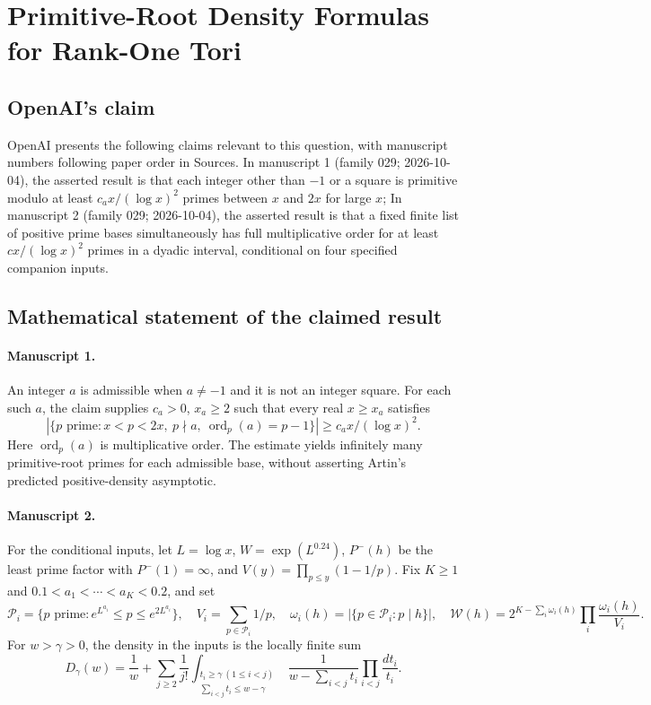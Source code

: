 \documentclass[11pt]{article}
\begin{document}
\section*{Primitive-Root Density Formulas for Rank-One Tori}

\subsection{OpenAI's claim}
OpenAI presents the following claims relevant to this question, with manuscript numbers following paper order in Sources. In manuscript 1 (family 029; 2026-10-04), the asserted result is that each integer other than $-1$ or a square is primitive modulo at least $c_a x/(\log x)^2$ primes between $x$ and $2x$ for large $x$; In manuscript 2 (family 029; 2026-10-04), the asserted result is that a fixed finite list of positive prime bases simultaneously has full multiplicative order for at least $cx/(\log x)^2$ primes in a dyadic interval, conditional on four specified companion inputs.

\subsection{Mathematical statement of the claimed result}
\paragraph{Manuscript 1.}
An integer $a$ is admissible when $a\ne-1$ and it is not an integer square. For each such $a$, the claim supplies $c_a>0$, $x_a\ge2$ such that every real $x\ge x_a$ satisfies
\[
 |\{p\text{ prime}:x<p<2x,\ p\nmid a,\ \operatorname{ord}_p(a)=p-1\}|
 \ge c_a x/(\log x)^2.
\]
Here $\operatorname{ord}_p(a)$ is multiplicative order. The estimate yields infinitely many primitive-root primes for each admissible base, without asserting Artin's predicted positive-density asymptotic.

\paragraph{Manuscript 2.}
For the conditional inputs, let $L=\log x$, $W=\exp(L^{0.24})$, $P^-(h)$ be the least prime factor with $P^-(1)=\infty$, and $V(y)=\prod_{p\le y}(1-1/p)$. Fix $K\ge1$ and $0.1<a_1<\cdots<a_K<0.2$, and set
\[
 \mathcal P_i=\{p\text{ prime}:e^{L^{a_i}}\le p\le e^{2L^{a_i}}\},\quad
 V_i=\sum_{p\in\mathcal P_i}1/p,\quad\omega_i(h)=|\{p\in\mathcal P_i:p\mid h\}|,
 \quad\mathcal W(h)=2^{K-\sum_i\omega_i(h)}\prod_i\frac{\omega_i(h)}{V_i}.
\]
For $w>\gamma>0$, the density in the inputs is the locally finite sum
\[
 D_{\gamma}(w)=\frac1w+
 \sum_{j\ge2}\frac1{j!}
 \int_{\substack{t_i\ge\gamma\ (1\le i<j)\\\sum_{i<j}t_i\le w-\gamma}}
 \frac1{w-\sum_{i<j}t_i}\prod_{i<j}\frac{dt_i}{t_i}.
\]
\end{document}
